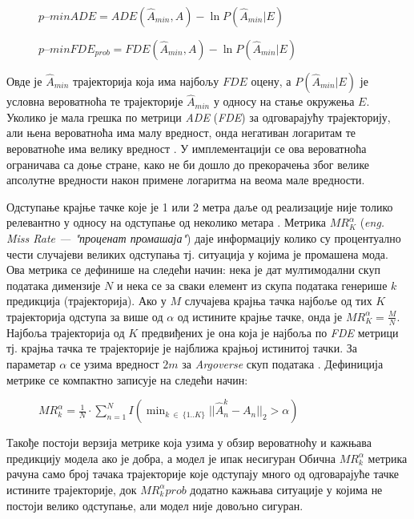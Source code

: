 \documentclass[11pt,oneside]{memoir}
\begin{document}
\begin{figure}[H]
  \centering
  $p\mbox{--}minADE = ADE(\hat{A}_{min}, A) - \ln{P(\hat{A}_{min}|E)}$
\end{figure}

\begin{figure}[H]
  \centering
  $p\mbox{--}minFDE_{prob} = FDE(\hat{A}_{min}, A) - \ln{P(\hat{A}_{min}|E)}$
\end{figure}

Овде је $\hat{A}_{min}$ трајекторија која има најбољу $FDE$ оцену, а $P(\hat{A}_{min}|E)$ је условна вероватноћа те 
трајекторије $\hat{A}_{min}$ у односу на стање окружења $E$. Уколико је мала грешка по метрици \textit{ADE} (\textit{FDE}) за одговарајућу трајекторију, 
али њена вероватноћа има малу вредност, онда негативан логаритам те вероватноће има велику вредност \cite{argoverse}.
У имплементацији се ова вероватноћа ограничава са доње стране, како не
би дошло до прекорачења због велике апсолутне вредности након примене логаритма на веома мале вредности.

Одступање крајње тачке које је 1 или 2 метра даље од реализације није толико релевантно у односу на одступање од 
неколико метара \cite{home}. Метрика $MR^{\alpha}_{K}$ (\textit{eng. Miss Rate --- "проценат промашаја"}) даје информацију
колико су процентуално чести случајеви великих одступања тј. ситуација у којима је промашена мода. Ова метрика се дефинише на следећи начин: 
нека је дат мултимодални скуп података димензије $N$ и нека се за сваки елемент из скупа података генерише $k$ предикција (трајекторија). Ако
у $M$ случајева крајња тачка најбоље од тих $K$ трајекторија одступа за више од $\alpha$ од истините крајње тачке, 
онда је $MR^{\alpha}_{K} = \frac{M}{N}$. Најбоља трајекторија од $K$ предвиђених је она која је најбоља по \textit{FDE} метрици тј.
крајња тачка те трајекторије је најближа крајњој истинитој тачки. За параметар $\alpha$ се узима вредност $2m$ за \textit{Argoverse} 
скуп података \cite{argoverse}. Дефиниција метрике се компактно записује на следећи начин:

\begin{figure}[H]
  \centering
  $MR^{\alpha}_{k} = \frac{1}{N}\cdot \sum^N_{n=1} I(\displaystyle\min_{k\ \in\ \{1..K\}}||\hat{A}^{k}_{n} - A_{n}||_{2} > \alpha)$
\end{figure}

Такође постоји верзија метрике која узима у обзир вероватноћу и кажњава предикцију модела ако је добра, а модел је ипак несигуран \cite{argoverse}
Обична $MR^{\alpha}_{k}$ метрика рачуна само број тачака трајекторије које одступају много од одговарајуће тачке истините трајекторије, док
$MR^{\alpha}_{k}{prob}$ додатно кажњава ситуације у којима не постоји велико одступање, али модел није довољно сигуран. 
\end{document}
